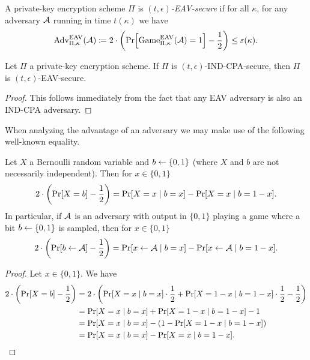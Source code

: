 \begin{definition}
	A private-key encryption scheme $\Pi$ is \emph{$(t, \epsilon)$-EAV-secure} if for all $\kappa$, for any adversary $\mathcal{A}$ running in time $t(\kappa)$ we have
	\begin{align*}
		\advantage{\Pi}{\kappa}{EAV}(\adv) \coloneqq 2 \cdot \left(\pr{\game{\Pi}{\kappa}{EAV}(\adv) = 1} - \frac{1}{2}\right) \le \epsilon(\kappa).
	\end{align*}
\end{definition}


\begin{lemma}
	Let $\Pi$ a private-key encryption scheme. If $\Pi$ is $(t, \epsilon)$-IND-CPA-secure, then $\Pi$ is $(t, \epsilon)$-EAV-secure.
\end{lemma}
\begin{proof}
	This follows immediately from the fact that any EAV adversary is also an IND-CPA adversary.
\end{proof}

When analyzing the advantage of an adversary we may make use of the following well-known equality.

\begin{lemma}
	Let $X$ a Bernoulli random variable and $b \leftarrow \{0, 1\}$ (where $X$ and $b$ are not necessarily independent). Then for $x \in \{0, 1\}$
	\[
		2 \cdot \left(\pr{X = b} - \frac{1}{2}\right) = \pr{X = x \mid b = x} - \pr{X = x \mid b = 1 - x}.
	\]
	In particular, if $\mathcal{A}$ is an adversary with output in $\{0, 1\}$ playing a game where a bit $b \leftarrow \{0, 1\}$ is sampled, then for $x \in \{0, 1\}$
	\begin{equation} \label{eq:advantage-equality}
		2 \cdot \left(\pr{b \from \adv} - \frac{1}{2}\right) = \pr{x \from \adv \mid b = x} - \pr{x \from \adv \mid b = 1 - x}.
	\end{equation}
\end{lemma}
\begin{proof}
	Let $x \in \{0, 1\}$. We have
	\begin{align*}
		2 \cdot \left(\pr{X = b} - \frac{1}{2}\right) & = 2 \cdot \left(\pr{X = x \mid b = x} \cdot \frac{1}{2} + \pr{X = 1 - x \mid b = 1 - x} \cdot \frac{1}{2} - \frac{1}{2}\right) \\
		                                              & = \pr{X = x \mid b = x} + \pr{X = 1 - x \mid b = 1 - x} - 1                                                                    \\
		                                              & = \pr{X = x \mid b = x} - (1 - \pr{X = 1 - x \mid b = 1 - x})                                                                  \\
		                                              & = \pr{X = x \mid b = x} - \pr{X = x \mid b = 1 - x}.
	\end{align*}
\end{proof}

